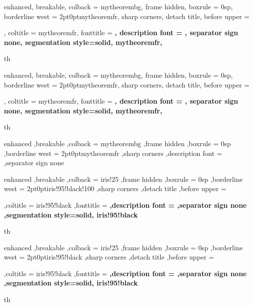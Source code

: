 
\setlength{\parindent}{1cm}

{%
	enhanced,
	breakable,
	colback = mytheorembg,
	frame hidden,
	boxrule = 0sp,
	borderline west = {2pt}{0pt}{mytheoremfr},
	sharp corners,
	detach title,
	before upper = \tcbtitle\par\smallskip,
	coltitle = mytheoremfr,
	fonttitle = \bfseries\sffamily,
	description font = \mdseries,
	separator sign none,
	segmentation style={solid, mytheoremfr},
}
{th}

{%
	enhanced,
	breakable,
	colback = mytheorembg,
	frame hidden,
	boxrule = 0sp,
	borderline west = {2pt}{0pt}{mytheoremfr},
	sharp corners,
	detach title,
	before upper = \tcbtitle\par\smallskip,
	coltitle = mytheoremfr,
	fonttitle = \bfseries\sffamily,
	description font = \mdseries,
	separator sign none,
	segmentation style={solid, mytheoremfr},
}
{th}


{%
	enhanced
	,breakable
	,colback = mytheorembg
	,frame hidden
	,boxrule = 0sp
	,borderline west = {2pt}{0pt}{mytheoremfr}
	,sharp corners
	,description font = \mdseries
	,separator sign none
}

{%
	enhanced
	,breakable
	,colback = iris!25
	,frame hidden
	,boxrule = 0sp
	,borderline west = {2pt}{0pt}{iris!95!black!100}
	,sharp corners
	,detach title
	,before upper = \tcbtitle\par\smallskip
	,coltitle = iris!95!black
	,fonttitle = \bfseries\sffamily
	,description font = \mdseries
	,separator sign none
	,segmentation style={solid, iris!95!black}
}
{th}
{%
	enhanced
	,breakable
	,colback = iris!25
	,frame hidden
	,boxrule = 0sp
	,borderline west = {2pt}{0pt}{iris!95!black}
	,sharp corners
	,detach title
	,before upper = \tcbtitle\par\smallskip
	,coltitle = iris!95!black
	,fonttitle = \bfseries\sffamily
	,description font = \mdseries
	,separator sign none
	,segmentation style={solid, iris!95!black}
}
{th}


